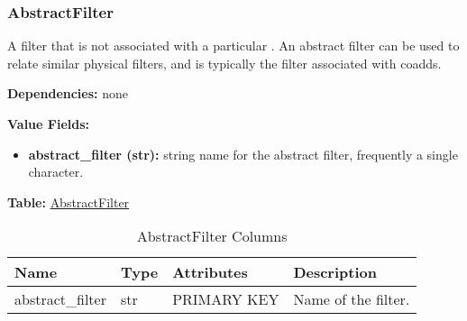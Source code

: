 \subsubsection{AbstractFilter}
\label{unit:AbstractFilter}

A filter that is not associated with a particular .
An abstract filter can be used to relate similar physical filters, and
is typically the filter associated with coadds.

\textbf{Dependencies:} none

\textbf{Value Fields:}
\begin{itemize}
  \item \textbf{abstract\_filter (str):}
      string name for the abstract filter, frequently a single
      character.
\end{itemize}

\textbf{Table:} \hyperref[tbl:AbstractFilter]{AbstractFilter}
\begin{table}[!htb]
  {\footnotesize
    \begin{tabular}{| l | l | l | p{} |}
      \hline
      \textbf{Name} & \textbf{Type} & \textbf{Attributes} & \textbf{Description} \\
      \hline
      abstract\_filter & str & PRIMARY KEY &
              Name of the filter.
          \\
      \hline
    \end{tabular}
  }
  \caption{AbstractFilter Columns}
  \label{tbl:AbstractFilter}
\end{table}
